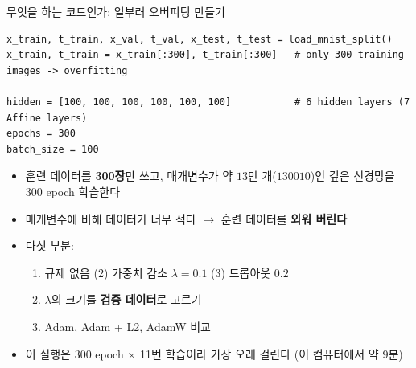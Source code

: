 \documentclass[aspectratio=169,11pt]{beamer}
\begin{document}
\begin{frame}[fragile]{무엇을 하는 코드인가: 일부러 오버피팅 만들기}
\begin{lstlisting}
x_train, t_train, x_val, t_val, x_test, t_test = load_mnist_split()
x_train, t_train = x_train[:300], t_train[:300]   # only 300 training images -> overfitting

hidden = [100, 100, 100, 100, 100, 100]           # 6 hidden layers (7 Affine layers)
epochs = 300
batch_size = 100
\end{lstlisting}
\begin{itemize}
\item 훈련 데이터를 \textbf{300장}만 쓰고, 매개변수가 약 $13$만 개($130010$)인 깊은 신경망을 $300$ epoch 학습한다
\item 매개변수에 비해 데이터가 너무 적다 $\to$ 훈련 데이터를 \textbf{외워 버린다}
\item 다섯 부분:
\begin{enumerate}
\item 규제 없음 \quad (2) 가중치 감소 $\lambda=0.1$ \quad (3) 드롭아웃 $0.2$
\item[(4)] $\lambda$의 크기를 \textbf{검증 데이터}로 고르기
\item[(5)] Adam, Adam + L2, AdamW 비교
\end{enumerate}
\item 이 실행은 $300$ epoch $\times$ 11번 학습이라 가장 오래 걸린다 (이 컴퓨터에서 약 9분)
\end{itemize}
\end{frame}
\end{document}

